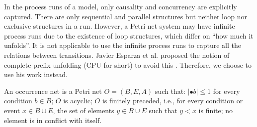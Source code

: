 \documentclass{llncs}
\begin{document}
In the process runs of a model, only causality and concurrency are explicitly captured. There are only sequential and parallel structures but neither loop nor exclusive structures in a run. However, a Petri net system may have infinite process runs due to the existence of loop structures, which differ on ``how much it unfolds''. It is not applicable to use the infinite process runs to capture all the relations between transitions. Javier Esparza et al. proposed the notion of complete prefix unfolding (CPU for short) to avoid this \cite{esparza2002improvement}. Therefore, we choose to use his work instead.

\begin{definition}\label{def:occurrenceNet}
An occurrence net is a Petri net $O=(B,E,A)$ such that: $|\bullet b|\leq 1$ for every condition $b\in B$; $O$ is acyclic; $O$ is finitely preceded, i.e., for every condition or event $x\in B\cup E$, the set of elements $y\in B\cup E$ such that $y<x$ is finite; no element is in conflict with itself.
\end{definition}

\end{document}
